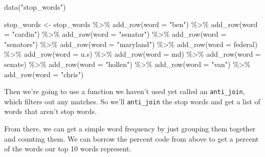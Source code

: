 \documentclass[
  letterpaper,
  DIV=11,
  numbers=noendperiod]{scrreprt}
\newenvironment{Shaded}{\begin{snugshade}}{\end{snugshade}}
\newcommand{\AttributeTok}[1]{\textcolor[rgb]{0.40,0.45,0.13}{#1}}
\newcommand{\FunctionTok}[1]{\textcolor[rgb]{0.28,0.35,0.67}{#1}}
\newcommand{\NormalTok}[1]{\textcolor[rgb]{0.00,0.23,0.31}{#1}}
\newcommand{\OtherTok}[1]{\textcolor[rgb]{0.00,0.23,0.31}{#1}}
\newcommand{\SpecialCharTok}[1]{\textcolor[rgb]{0.37,0.37,0.37}{#1}}
\newcommand{\StringTok}[1]{\textcolor[rgb]{0.13,0.47,0.30}{#1}}
\begin{document}
\begin{Shaded}
\begin{Highlighting}[]
\FunctionTok{data}\NormalTok{(}\StringTok{"stop\_words"}\NormalTok{)}

\NormalTok{stop\_words }\OtherTok{\textless{}{-}}\NormalTok{ stop\_words }\SpecialCharTok{\%\textgreater{}\%} 
  \FunctionTok{add\_row}\NormalTok{(}\AttributeTok{word =} \StringTok{"ben"}\NormalTok{) }\SpecialCharTok{\%\textgreater{}\%} 
  \FunctionTok{add\_row}\NormalTok{(}\AttributeTok{word =} \StringTok{"cardin"}\NormalTok{) }\SpecialCharTok{\%\textgreater{}\%} 
  \FunctionTok{add\_row}\NormalTok{(}\AttributeTok{word =} \StringTok{"senator"}\NormalTok{) }\SpecialCharTok{\%\textgreater{}\%}
  \FunctionTok{add\_row}\NormalTok{(}\AttributeTok{word =} \StringTok{"senators"}\NormalTok{) }\SpecialCharTok{\%\textgreater{}\%}
  \FunctionTok{add\_row}\NormalTok{(}\AttributeTok{word =} \StringTok{"maryland"}\NormalTok{) }\SpecialCharTok{\%\textgreater{}\%}
  \FunctionTok{add\_row}\NormalTok{(}\AttributeTok{word =} \StringTok{\textquotesingle{}federal\textquotesingle{}}\NormalTok{) }\SpecialCharTok{\%\textgreater{}\%} 
  \FunctionTok{add\_row}\NormalTok{(}\AttributeTok{word =} \StringTok{\textquotesingle{}u.s\textquotesingle{}}\NormalTok{) }\SpecialCharTok{\%\textgreater{}\%} 
  \FunctionTok{add\_row}\NormalTok{(}\AttributeTok{word =} \StringTok{\textquotesingle{}md\textquotesingle{}}\NormalTok{) }\SpecialCharTok{\%\textgreater{}\%} 
  \FunctionTok{add\_row}\NormalTok{(}\AttributeTok{word =} \StringTok{\textquotesingle{}senate\textquotesingle{}}\NormalTok{) }\SpecialCharTok{\%\textgreater{}\%} 
  \FunctionTok{add\_row}\NormalTok{(}\AttributeTok{word =} \StringTok{"hollen"}\NormalTok{) }\SpecialCharTok{\%\textgreater{}\%} 
  \FunctionTok{add\_row}\NormalTok{(}\AttributeTok{word =} \StringTok{"van"}\NormalTok{) }\SpecialCharTok{\%\textgreater{}\%} 
  \FunctionTok{add\_row}\NormalTok{(}\AttributeTok{word =} \StringTok{"chris"}\NormalTok{)}
\end{Highlighting}
\end{Shaded}

Then we're going to use a function we haven't used yet called an
\texttt{anti\_join}, which filters out any matches. So we'll
\texttt{anti\_join} the stop words and get a list of words that aren't
stop words.

From there, we can get a simple word frequency by just grouping them
together and counting them. We can borrow the percent code from above to
get a percent of the words our top 10 words represent.
\end{document}

